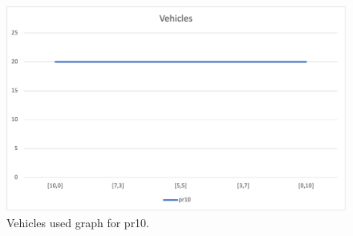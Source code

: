 \begin{figure}[H]
    \centering
    \includegraphics[width=1.0\columnwidth]{../graphs/pr10-vehicles.png}
    \caption{Vehicles used graph for pr10.}
\end{figure}
